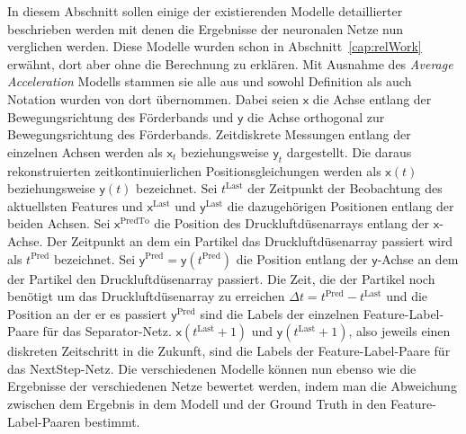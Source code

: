 
In diesem Abschnitt sollen einige der existierenden Modelle detaillierter beschrieben werden mit denen die Ergebnisse der neuronalen Netze nun verglichen werden.
Diese Modelle wurden schon in Abschnitt~\ref{cap:relWork} erwähnt, dort aber ohne die Berechnung zu erklären.
Mit Ausnahme des \textit{Average Acceleration} Modells stammen sie alle aus \cite{Pfaff2018} und sowohl Definition als auch Notation wurden von dort übernommen.
Dabei seien \(\mathsf{x}\) die Achse entlang der Bewegungsrichtung des Förderbands und \(\mathsf{y}\) die Achse orthogonal zur Bewegungsrichtung des Förderbands.
Zeitdiskrete Messungen entlang der einzelnen Achsen werden als \(\mathsf{x}_t\) beziehungsweise \(\mathsf{y}_t\) dargestellt.
Die daraus rekonstruierten zeitkontinuierlichen Positionsgleichungen werden als \(\mathsf{x}(t)\) beziehungsweise \(\mathsf{y}(t)\) bezeichnet.
Sei \(t^{\text{Last}}\) der Zeitpunkt der Beobachtung des aktuellsten Features und \(\mathsf{x}^{\text{Last}}\) und \(\mathsf{y}^{\text{Last}}\) die dazugehörigen Positionen entlang der beiden Achsen.
Sei \(\mathsf{x}^{\text{PredTo}}\) die Position des Druckluftdüsenarrays entlang der \(\mathsf{x}\)-Achse.
Der Zeitpunkt an dem ein Partikel das Druckluftdüsenarray passiert wird als \(t^{\text{Pred}}\) bezeichnet.
Sei \(\mathsf{y}^{\text{Pred}} = \mathsf{y}(t^{\text{Pred}})\) die Position entlang der \(\mathsf{y}\)-Achse an dem der Partikel den Druckluftdüsenarray passiert.
Die Zeit, die der Partikel noch benötigt um das Druckluftdüsenarray zu erreichen \(\Delta t = t^{\text{Pred}} - t^{\text{Last}} \) und die Position an der er es passiert \(\mathsf{y}^{\text{Pred}}\) sind die Labels der einzelnen Feature-Label-Paare für das Separator-Netz.
\(\mathsf{x}(t^{\text{Last}} + 1)\) und \(\mathsf{y}(t^{\text{Last}} + 1)\), also jeweils einen diskreten Zeitschritt in die Zukunft, sind die Labels der Feature-Label-Paare für das NextStep-Netz.
Die verschiedenen Modelle können nun ebenso wie die Ergebnisse der verschiedenen Netze bewertet werden, 
indem man die Abweichung zwischen dem Ergebnis in dem Modell und der Ground Truth in den Feature-Label-Paaren bestimmt.


